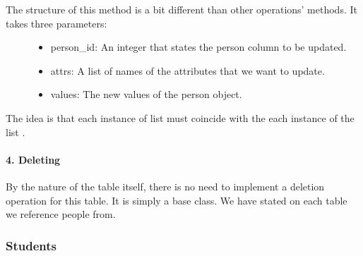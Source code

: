 \documentclass[letterpaper,10pt,english]{sphinxmanual}
\begin{document}
\begin{description}
\item[{The structure of this method is a bit different than other operations’ methods. It takes three parameters:}] \leavevmode\begin{itemize}
\item {} 
person\_id: An integer that states the person column to be updated.

\item {} 
attrs: A list of names of the attributes that we want to update.

\item {} 
values: The new values of the person object.

\end{itemize}

\end{description}

The idea is that each instance of list  must coincide with the each instance of the list .


\paragraph{4. Deleting}
\label{\detokenize{developer/mehmet:deleting}}
By the nature of the table itself, there is no need to implement a deletion operation for this table. It is simply a base class. We have stated  on each table we reference people from.


\subsubsection{Students}
\label{\detokenize{developer/mehmet:students}}
\end{document}
